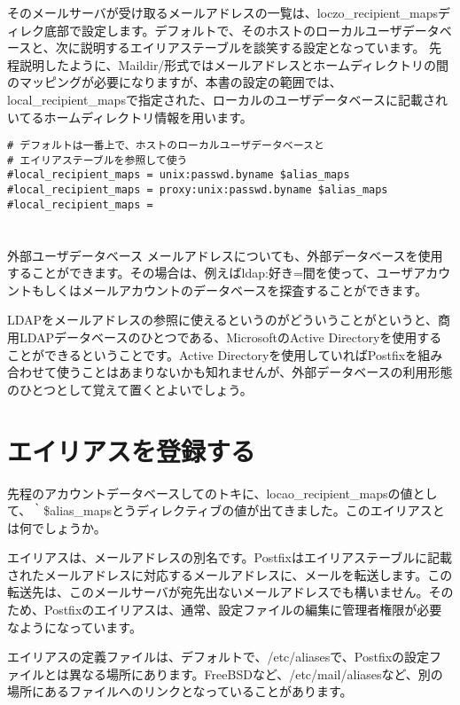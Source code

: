 そのメールサーバが受け取るメールアドレスの一覧は、loczo\_recipient\_mapsディレク底部で設定します。デフォルトで、そのホストのローカルユーザデータベースと、次に説明するエイリアステーブルを談笑する設定となっています。
先程説明したように、Maildir/形式ではメールアドレスとホームディレクトリの間のマッピングが必要になりますが、本書の設定の範囲では、local\_recipient\_mapsで指定された、ローカルのユーザデータベースに記載されいてるホームディレクトリ情報を用います。

\begin{lstlisting}[basicstyle=\ttfamily\footnotesize, frame=single]
# デフォルトは一番上で、ホストのローカルユーザデータベースと
# エイリアステーブルを参照して使う
#local_recipient_maps = unix:passwd.byname $alias_maps
#local_recipient_maps = proxy:unix:passwd.byname $alias_maps
#local_recipient_maps =
\end{lstlisting}

\section*{}
\begin{itembox}[l]{外部ユーザデータベース}
メールアドレスについても、外部データベースを使用することができます。その場合は、例えばldap:好き=間を使って、ユーザアカウントもしくはメールアカウントのデータベースを探査することができます。

LDAPをメールアドレスの参照に使えるというのがどういうことがというと、商用LDAPデータベースのひとつである、MicrosoftのActive Directoryを使用することができるということです。Active Directoryを使用していればPostfixを組み合わせて使うことはあまりないかも知れませんが、外部データベースの利用形態のひとつとして覚えて置くとよいでしょう。
\end{itembox}


\section{エイリアスを登録する}
先程のアカウントデータベースしてのトキに、locao\_recipient\_mapsの値として、｀\$alias\_mapsとうディレクティブの値が出てきました。このエイリアスとは何でしょうか。

エイリアスは、メールアドレスの別名です。Postfixはエイリアステーブルに記載されたメールアドレスに対応するメールアドレスに、メールを転送します。この転送先は、このメールサーバが宛先出ないメールアドレスでも構いません。そのため、Postfixのエイリアスは、通常、設定ファイルの編集に管理者権限が必要なようになっています。

エイリアスの定義ファイルは、デフォルトで、/etc/aliasesで、Postfixの設定ファイルとは異なる場所にあります。FreeBSDなど、/etc/mail/aliasesなど、別の場所にあるファイルへのリンクとなっていることがあります。

